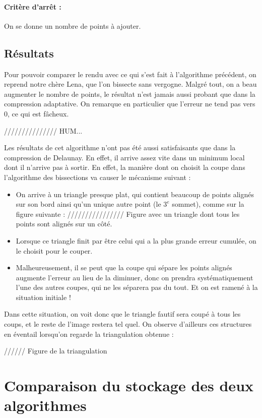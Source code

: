 \documentclass{report}
\begin{document}
\paragraph{Critère d'arrêt :}
On se donne un nombre de points à ajouter.

\subsection{Résultats}

Pour pouvoir comparer le rendu avec ce qui s'est fait à l'algorithme précédent, on reprend notre chère Lena, que l'on bissecte sans vergogne. Malgré tout, on a beau augmenter le nombre de points, le résultat n'est jamais aussi probant que dans la compression adaptative. On remarque en particulier que l'erreur ne tend pas vers 0, ce qui est fâcheux.

/////////////// HUM...


Les résultats de cet algorithme n'ont pas été aussi satisfaisants que dans la compression de Delaunay. En effet, il arrive assez vite dans un minimum local dont il n'arrive pas à sortir. En effet, la manière dont on choisit la coupe dans l'algorithme des bissections va causer le mécanisme suivant :
\begin{itemize}
	\item On arrive à un triangle presque plat, qui contient beaucoup de points alignés sur son bord ainsi qu'un unique autre point (le $3^e$ sommet), comme sur la figure suivante :
////////////////
Figure avec un triangle dont tous les points sont alignés sur un côté.

	\item Lorsque ce triangle finit par être celui qui a la plus grande erreur cumulée, on le choisit pour le couper.
	\item Malheureusement, il se peut que la coupe qui sépare les points alignés augmente l'erreur au lieu de la diminuer, donc on prendra systématiquement l'une des autres coupes, qui ne les séparera pas du tout. Et on est ramené à la situation initiale !
\end{itemize}

Dans cette situation, on voit donc que le triangle fautif sera coupé à tous les coups, et le reste de l'image restera tel quel. On observe d'ailleurs ces structures en éventail lorsqu'on regarde la triangulation obtenue :

//////
Figure de la triangulation


\section{Comparaison du stockage des deux algorithmes}
\end{document}
